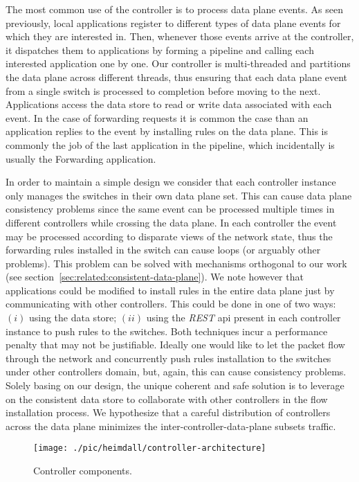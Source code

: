 The most common use of the controller is to process data plane events. 
As seen previously, local applications register to different types of data plane events for which they are interested in. 
Then, whenever those events arrive at the controller, it dispatches them to applications by forming a pipeline and calling each interested application one by one. 
Our controller is multi-threaded and partitions the data plane across different threads, thus ensuring  that each data plane event from a single switch is processed to completion before moving to the next. 
Applications access the data store to read or write data associated with each event. 
In the case of forwarding requests it is common the case  than an application replies to the event by installing rules on the data plane. This is commonly the job of the last application in the pipeline, which incidentally is usually the Forwarding application.

In order to maintain a simple design we consider that each controller instance only manages  the switches in their own data plane set. 
This can cause data plane consistency problems since the same event can be processed multiple times in different controllers while crossing the data plane. 
In each controller the event may be processed according to disparate views of the network state, thus the forwarding rules installed in the switch can cause loops (or arguably other problems). 
This problem can be solved with mechanisms orthogonal to our work (see section~\ref{sec:related:consistent-data-plane}).
We note however that applications could be modified to install rules in the entire data plane just by communicating with other controllers. 
This could be done in one of two ways: $(i)$ using the data store; $(ii)$ using the \emph{REST} \gls{api} present in each controller instance to push rules to the switches.  Both techniques incur a performance penalty that may not be justifiable. Ideally one would like to let the packet flow through the network and concurrently push rules installation to the switches under other controllers domain, but, again, this can cause consistency problems. 
Solely basing on our design, the unique coherent and safe solution is to leverage on the consistent data store to collaborate with other controllers in the flow installation process. 
We hypothesize that a careful distribution of controllers across the data plane minimizes the inter-controller-data-plane subsets traffic. 

\begin{figure}
  \centering
  \texttt{[image: ./pic/heimdall/controller-architecture]}
  \caption{Controller components. }
  \label{fig:heimdall:architecture}
\end{figure}



